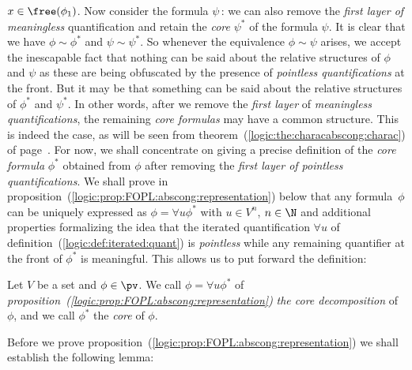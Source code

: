 $x\in\free(\phi_{1})$. Now consider the formula $\psi$\,: we can
also remove the {\em first layer of meaningless} quantification and
retain the {\em core} $\psi^{*}$ of the formula $\psi$. It is clear
that we have $\phi\sim\phi^{*}$ and $\psi\sim\psi^{*}$. So whenever
the equivalence $\phi\sim\psi$ arises, we accept the inescapable
fact that nothing can be said about the relative structures of
$\phi$ and $\psi$ as these are being obfuscated by the presence of
{\em pointless quantifications} at the front. But it may be that
something can be said about the relative structures of $\phi^{*}$
and $\psi^{*}$. In other words, after we remove the {\em first
layer} of {\em meaningless quantifications}, the remaining {\em core
formulas} may have a common structure. This is indeed the case, as
will be seen from theorem~(\ref{logic:the:characabscong:charac}) of
page~\pageref{logic:the:characabscong:charac}. For now, we shall
concentrate on giving a precise definition of the {\em core formula}
$\phi^{*}$ obtained from $\phi$ after removing the {\em first layer
of pointless quantifications}. We shall prove in
proposition~(\ref{logic:prop:FOPL:abscong:representation}) below
that any formula~$\phi$ can be uniquely expressed as $\phi=\forall
u\phi^{*}$ with $u\in V^{n}$, $n\in\N$ and additional properties
formalizing the idea that the iterated quantification $\forall u$ of
definition~(\ref{logic:def:iterated:quant}) is {\em pointless} while
any remaining quantifier at the front of $\phi^{*}$ is meaningful.
This allows us to put forward the definition:


\begin{defin}\label{logic:def:FOPL:abscong:core:decomposition}
Let $V$ be a set and $\phi\in\pv$. We call $\phi=\forall u\phi^{*}$
of {\em proposition~(\ref{logic:prop:FOPL:abscong:representation})}
{\em the core decomposition} of $\phi$, and we call $\phi^{*}$ the
{\em core} of $\phi$.
\end{defin}

Before we prove
proposition~(\ref{logic:prop:FOPL:abscong:representation}) we shall
establish the following lemma:

